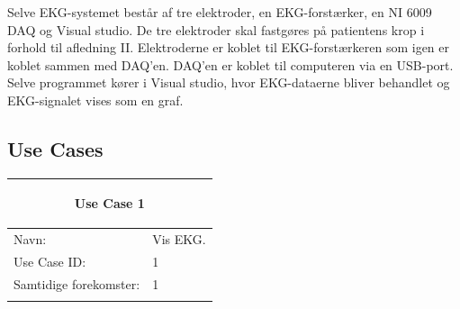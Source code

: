Selve EKG-systemet består af tre elektroder, en EKG-forstærker, en NI 6009 DAQ og Visual studio. De tre elektroder skal fastgøres på patientens krop i forhold til afledning II. Elektroderne er koblet til EKG-forstærkeren som igen er koblet sammen med DAQ'en. DAQ'en er koblet til computeren via en USB-port. Selve programmet kører i Visual studio, hvor EKG-dataerne bliver behandlet og EKG-signalet vises som en graf. 

\subsection{Use Cases}

\begin{table}[H] %
    \begin{tabularx}{\textwidth}{l X}
    \toprule 
    \multicolumn{2}{c}{\begin{large}\textbf{Use Case 1}\end{large}}
 \\ \midrule \addlinespace[1mm]                                                                                                                                                        
     Navn:                  &  Vis EKG. \\ \addlinespace[1mm]                                                                                                                                                       
     Use Case ID:           & 1                                                                                                                                                                                                                                                                                                                                                                                                                                                                                                                                                                                                                         \\ \addlinespace[1mm]                                                                                                                                                       
     Samtidige forekomster: & 1                                                                                                                                                                                                                                                                                                                                                                                                                                                                                                                                                                                                                         \\ \addlinespace[1mm]                                                                                                                                                       

\end{tabularx}
\end{table}
